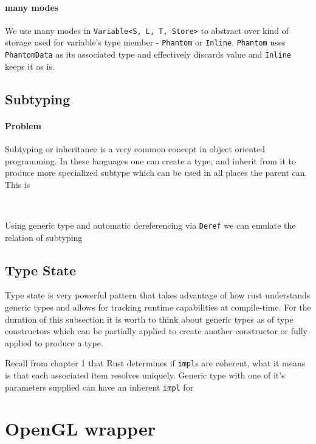\paragraph{many modes}

We use many modes in \texttt{Variable<S, L, T, Store>} to abstract over kind of storage used for variable's type member - \texttt{Phantom} or \texttt{Inline}.
\texttt{Phantom} uses \texttt{PhantomData} as its associated type and effectively discards value and \texttt{Inline} keeps it as is.

\subsection{Subtyping}

\paragraph{Problem}

Subtyping or inheritance is a very common concept in object oriented programming. 
In these languages one can create a type, and inherit from it to produce more specialized subtype which can be used in all places the parent can.
This is 



\

Using generic type and automatic dereferencing via \texttt{Deref} we can emulate the relation of subtyping


\subsection{Type State}

Type state is very powerful pattern that takes advantage of how rust understands generic types and allows for tracking runtime capabilities at compile-time.
For the duration of this subsection it is worth to think about generic types as of type constructors which can be partially applied to create another constructor or fully applied to produce a type.

Recall from chapter 1 that Rust determines if \texttt{impl}s are coherent, what it means is that each associated item resolves uniquely.
Generic type with one of it's parameters supplied can have an inherent \texttt{impl} for 

\section{OpenGL wrapper}
  
